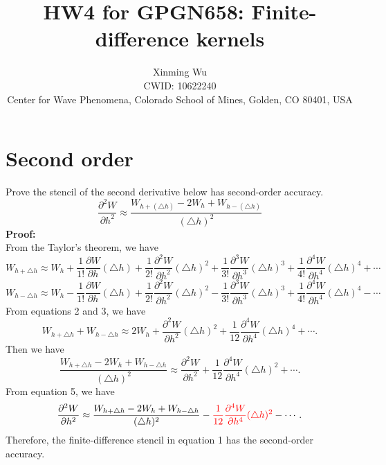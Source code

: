 \documentclass[referee]{../../../texCls/mayWithTeaser}
\begin{document}
\title{HW4 for GPGN658: Finite-difference kernels}
\author[X.~Wu]
{Xinming Wu\\
CWID: 10622240\\
Center for Wave Phenomena, Colorado School of Mines, Golden, CO 80401, USA}
\maketitle
\section{Second order}
Prove the stencil of the second derivative below has second-order accuracy.
\begin{equation}
\frac{\partial^2W}{\partial h^2}
\approx \frac{W_{h+(\triangle h)}-2W_h+W_{h-(\triangle h)}}{(\triangle h)^2}
\end{equation}
\textbf{Proof:}\\
From the Taylor's theorem, we have
\begin{equation}
W_{h+\triangle h} \approx W_h+\frac{1}{1!}\frac{\partial W}{\partial h}(\triangle h)
              +\frac{1}{2!}\frac{\partial^2 W}{\partial h^2}(\triangle h)^2
              +\frac{1}{3!}\frac{\partial^3 W}{\partial h^3}(\triangle h)^3
              +\frac{1}{4!}\frac{\partial^4 W}{\partial h^4}(\triangle h)^4
              +\cdots
\end{equation}
\begin{equation}
W_{h-\triangle h} \approx W_h-\frac{1}{1!}\frac{\partial W}{\partial h}(\triangle h)
              +\frac{1}{2!}\frac{\partial^2 W}{\partial h^2}(\triangle h)^2
              -\frac{1}{3!}\frac{\partial^3 W}{\partial h^3}(\triangle h)^3
              +\frac{1}{4!}\frac{\partial^4 W}{\partial h^4}(\triangle h)^4
              -\cdots
\end{equation}
From equations 2 and 3, we have
\begin{equation}
W_{h+\triangle h}+W_{h-\triangle h}\approx
2W_h+\frac{\partial^2 W}{\partial h^2}(\triangle h)^2
+\frac{1}{12}\frac{\partial^4 W}{\partial h^4}(\triangle h)^4+\cdots.
\end{equation}
Then we have
\begin{equation}
\frac{W_{h+\triangle h}-2W_h+W_{h-\triangle h}}{(\triangle h)^2}\approx
\frac{\partial^2 W}{\partial h^2}
+\frac{1}{12}\frac{\partial^4 W}{\partial h^4}(\triangle h)^2+\cdots.
\end{equation}
From equation 5, we have
\begin{equation}
\frac{\partial^2 W}{\partial h^2}\approx
\frac{W_{h+\triangle h}-2W_h+W_{h-\triangle h}}{(\triangle h)^2}
-\textcolor{red}{\frac{1}{12}\frac{\partial^4 W}{\partial h^4}(\triangle h)^2}-\cdots.
\end{equation}
Therefore, the finite-difference stencil in equation 1 has the second-order
accuracy.
\end{document}
